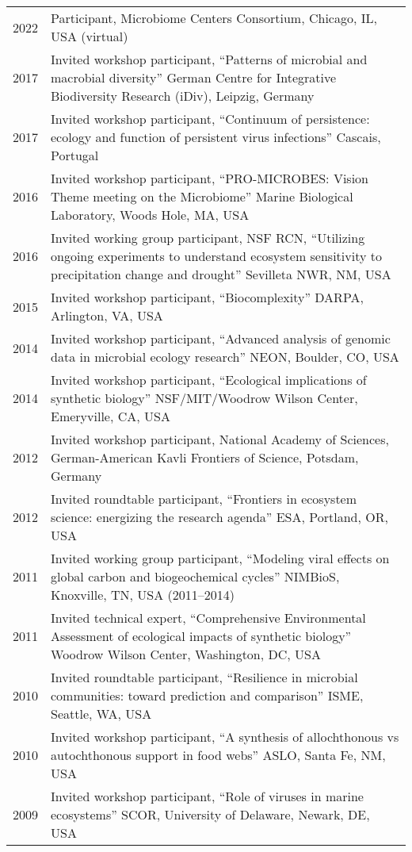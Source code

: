 \documentclass[11pt]{article}
\begin{document}
\begin{longtable}{@{}p{2cm}@{\hspace{1em}}p{14cm}@{}}
2022 & Participant, Microbiome Centers Consortium, Chicago, IL, USA (virtual) \\
2017 & Invited workshop participant, “Patterns of microbial and macrobial diversity” German Centre for Integrative Biodiversity Research (iDiv), Leipzig, Germany \\
2017 & Invited workshop participant, “Continuum of persistence: ecology and function of persistent virus infections” Cascais, Portugal \\
2016 & Invited workshop participant, “PRO-MICROBES: Vision Theme meeting on the Microbiome” Marine Biological Laboratory, Woods Hole, MA, USA \\
2016 & Invited working group participant, NSF RCN, “Utilizing ongoing experiments to understand ecosystem sensitivity to precipitation change and drought” Sevilleta NWR, NM, USA \\
2015 & Invited workshop participant, “Biocomplexity” DARPA, Arlington, VA, USA \\
2014 & Invited workshop participant, “Advanced analysis of genomic data in microbial ecology research” NEON, Boulder, CO, USA \\
2014 & Invited workshop participant, “Ecological implications of synthetic biology” NSF/MIT/Woodrow Wilson Center, Emeryville, CA, USA \\
2012 & Invited workshop participant, National Academy of Sciences, German-American Kavli Frontiers of Science, Potsdam, Germany \\
2012 & Invited roundtable participant, “Frontiers in ecosystem science: energizing the research agenda” ESA, Portland, OR, USA \\
2011 & Invited working group participant, “Modeling viral effects on global carbon and biogeochemical cycles” NIMBioS, Knoxville, TN, USA (2011--2014) \\
2011 & Invited technical expert, “Comprehensive Environmental Assessment of ecological impacts of synthetic biology” Woodrow Wilson Center, Washington, DC, USA \\
2010 & Invited roundtable participant, “Resilience in microbial communities: toward prediction and comparison” ISME, Seattle, WA, USA \\
2010 & Invited workshop participant, “A synthesis of allochthonous vs autochthonous support in food webs” ASLO, Santa Fe, NM, USA \\
2009 & Invited workshop participant, “Role of viruses in marine ecosystems” SCOR, University of Delaware, Newark, DE, USA \\

\end{longtable}
\end{document}
